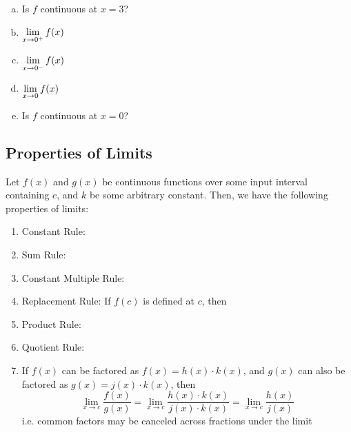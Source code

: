 \documentclass[notes]{subfiles}
\begin{document}
\begin{ex}
\begin{minipage}{\textwidth}
\begin{multicols*}{3}
\begin{enumerate}[(a)]
				\item Is $f$ continuous at $x =3 $?\\[50pt]
					\columnbreak
				\item $\displaystyle \lim_{x\to 0^+} f(x)$\\[50pt] 
				\item $\displaystyle \lim_{x\to 0^-} f(x)$\\[50pt]  
				\item $\displaystyle \lim_{x\to 0} f(x)$\\[50pt] 
				\item Is $f$ continuous at $x =0 $?\\[50pt]
			\end{enumerate}
				\raggedcolumns
			\end{multicols*}
		\end{minipage}
		\end{ex}
			\newpage

	\subsection*{Properties of Limits}
		Let $f(x)$ and $g(x)$ be continuous functions over some input interval containing $c$, and $k$ be some arbitrary constant.  Then, we have the following properties of limits:
		\begin{enumerate}[(1)]
			\item Constant Rule: 
			\item Sum Rule: 
			\item Constant Multiple Rule: 
			\item Replacement Rule: If $f(c)$ is defined at $c$, then 
			\item Product Rule: 
			\item Quotient Rule: 
			\item If $f(x)$ can be factored as $f(x) = h(x)\cdot k(x)$, and $g(x)$ can also be factored as $g(x) = j(x)\cdot k(x)$, then
				\[\lim_{x\to c} \frac{f(x)}{g(x)} = \lim_{x\to c}\frac{h(x)\cdot k(x)}{j(x) \cdot k(x)} = \lim_{x\to c} \frac{h(x)}{j(x)}\]
				i.e. common factors may be canceled across fractions under the limit
		\end{enumerate}
			\newpage
\end{document}
